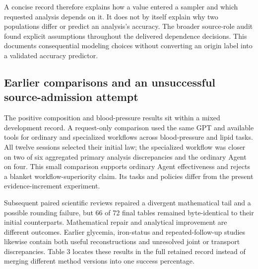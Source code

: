 \documentclass[11pt,letterpaper]{article}
\begin{document}
\endgroup

A concise record therefore explains how a value entered a sampler and which requested analysis depends on it. It does not by itself explain why two populations differ or predict an analysis's accuracy. The broader source-role audit found explicit assumptions throughout the delivered dependence decisions. This documents consequential modeling choices without converting an origin label into a validated accuracy predictor.


\subsection{Earlier comparisons and an unsuccessful source-admission attempt}

The positive composition and blood-pressure results sit within a mixed development record. A request-only comparison used the same GPT and available tools for ordinary and specialized workflows across blood-pressure and lipid tasks. All twelve sessions selected their initial law; the specialized workflow was closer on two of six aggregated primary analysis discrepancies and the ordinary Agent on four. This small comparison supports ordinary Agent effectiveness and rejects a blanket workflow-superiority claim. Its tasks and policies differ from the present evidence-increment experiment.


Subsequent paired scientific reviews repaired a divergent mathematical tail and a possible rounding failure, but 66 of 72 final tables remained byte-identical to their initial counterparts. Mathematical repair and analytical improvement are different outcomes. Earlier glycemia, iron-status and repeated-follow-up studies likewise contain both useful reconstructions and unresolved joint or transport discrepancies. Table 3 locates these results in the full retained record instead of merging different method versions into one success percentage.


\FloatBarrier

\begingroup

\small

\renewcommand{\arraystretch}{1.22}
\end{document}
